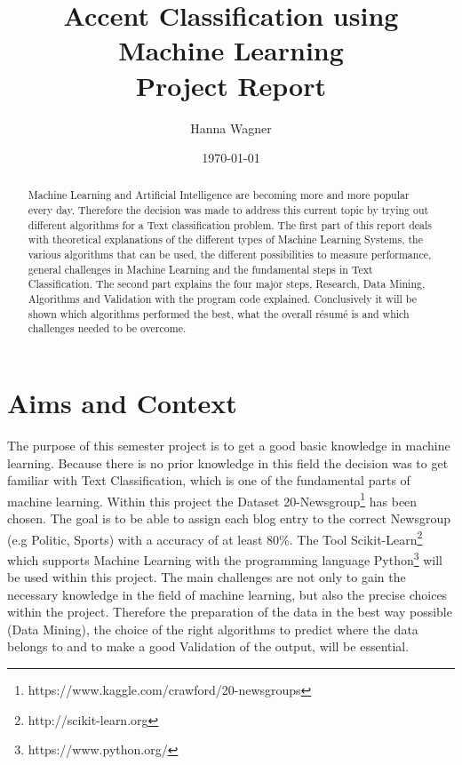 \documentclass[notitlepage,english]{hgbreport}
\author{Hanna Wagner}
\title{Accent Classification using Machine Learning\\ 
			Project Report}
\date{\today}
\begin{document}

\maketitle

\begin{abstract}
\noindent
Machine Learning and Artificial Intelligence are becoming more and more popular every day. Therefore the decision was made to address this current topic by trying out different algorithms for a Text classification problem. The first part of this report deals with theoretical explanations of the different types of Machine Learning Systems, the various algorithms that can be used, the different possibilities to measure performance, general challenges in Machine Learning and the fundamental steps in Text Classification. The second part explains the four major steps, Research, Data Mining, Algorithms and Validation with the program code explained. Conclusively it will be shown which algorithms performed the best, what the overall résumé is and which challenges needed to be overcome.

\end{abstract}


\tableofcontents
\listoffigures
\listoftables

\chapter{Aims and Context}
The purpose of this semester project is to get a good basic knowledge in machine learning. Because there is no prior knowledge in this field the decision was to get familiar with Text Classification, which is one of the fundamental parts of machine learning. 
\newline \newline
Within this project the Dataset 20-Newsgroup\footnote{https://www.kaggle.com/crawford/20-newsgroups} has been chosen. The goal is to be able to assign each blog entry to the correct Newsgroup (e.g Politic, Sports) with a accuracy of at least 80\%. The Tool Scikit-Learn\footnote{http://scikit-learn.org} which supports Machine Learning with the programming language Python\footnote{https://www.python.org/} will be used within this project.
\newline \newline
The main challenges are not only to gain the necessary knowledge in the field of machine learning, but also the precise choices within the project. Therefore the preparation of the data in the best way possible (Data Mining), the choice of the right algorithms to predict where the data belongs to and to make a good Validation of the output, will be essential.
\end{document}
